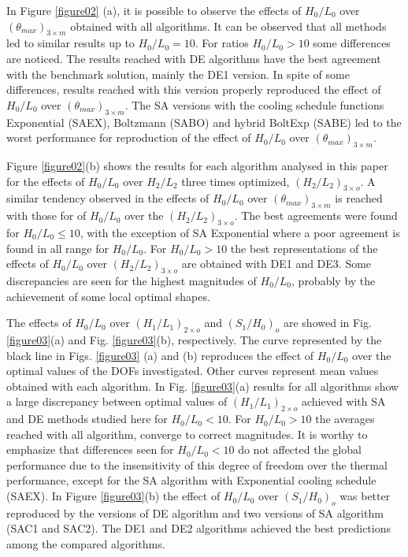\documentclass[12pt,fleqn]{article}
\begin{document}
In Figure \ref{figure02} (a), it is possible to observe the effects of $H_{0}/L_{0}$ over $({\theta}_{max})_{3\times m}$ obtained with all algorithms. It can be observed that all methods led to similar results up to $H_{0}/L_{0}=10$. For ratios $H_{0}/L_{0}>10$ some differences are noticed. The results reached with DE algorithms have the best agreement with the benchmark solution, mainly the DE1 version. In spite of some differences, results reached with this version properly reproduced the effect of $H_{0}/L_{0}$ over $({\theta}_{max})_{3\times m}$. The SA versions with the cooling schedule functions Exponential (SAEX), Boltzmann (SABO) and hybrid BoltExp (SABE) led to the worst performance for reproduction of the effect of  $H_{0}/L_{0}$ over $({\theta}_{max})_{3\times m}$.

Figure \ref{figure02}(b) shows the results for each algorithm analysed in this paper for the effects of  $H_{0}/L_{0}$ over $H_{2}/L_{2}$ three times optimized, $(H_{2}/L_{2})_{3\times o}$. A similar tendency observed in the effects of $H_{0}/L_{0}$ over $({\theta}_{max})_{3\times m}$ is reached with those for of $H_{0}/L_{0}$ over the $(H_{2}/L_{2})_{3\times o}$. The best agreements were found for $H_{0}/L_{0}\leqslant10$, with the exception of SA Exponential where a poor agreement is found in all range for $H_{0}/L_{0}$. For $H_{0}/L_{0}>10$ the best representations of the effects of $H_{0}/L_{0}$ over $(H_{2}/L_{2})_{3\times o}$ are obtained with DE1 and DE3. Some discrepancies are seen for the highest magnitudes of $H_{0}/L_{0}$, probably by the achievement of some local optimal shapes.

The effects of $H_{0}/L_{0}$ over $(H_{1}/L_{1})_{2\times o}$ and $(S_{1}/H_{0})_{o}$ are showed in Fig. \ref{figure03}(a) and Fig. \ref{figure03}(b), respectively. The curve represented by the black line in Figs. \ref{figure03} (a) and (b) reproduces the effect of $H_{0}/L_{0}$ over the optimal values of the DOFs investigated. Other curves represent mean values obtained with each algorithm. In Fig. \ref{figure03}(a) results for all algorithms show a large discrepancy between optimal values of $(H_{1}/L_{1})_{2\times o}$ achieved with SA and DE methods studied here for $H_{0}/L_{0}<10$. For $H_{0}/L_{0}>10$ the averages reached with all algorithm, converge to correct magnitudes. It is worthy to emphasize that differences seen for $H_{0}/L_{0}<10$ do not affected the global performance due to the insensitivity of this degree of freedom over the thermal performance, except for the SA algorithm with Exponential cooling schedule (SAEX). In Figure \ref{figure03}(b) the effect of $H_{0}/L_{0}$ over $(S_{1}/H_{0})_{o}$ was better reproduced by the versions of DE algorithm and two versions of SA algorithm (SAC1 and SAC2). The DE1 and DE2 algorithms achieved the best predictions among the compared algorithms.
\end{document}
